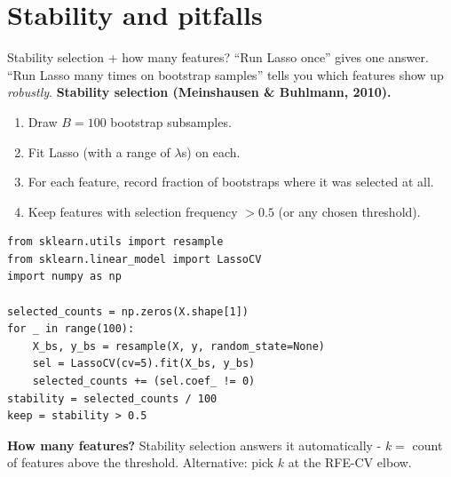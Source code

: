 \documentclass[aspectratio=169]{beamer}
\begin{document}
\section{Stability and pitfalls}

\begin{frame}[fragile]{Stability selection + how many features?}
  ``Run Lasso once'' gives one answer. ``Run Lasso many times on bootstrap samples'' tells you which features show up \emph{robustly}.
  \vfill
  \textbf{Stability selection (Meinshausen \& Buhlmann, 2010).}
  \begin{enumerate}\small
    \item Draw $B = 100$ bootstrap subsamples.
    \item Fit Lasso (with a range of $\lambda$s) on each.
    \item For each feature, record fraction of bootstraps where it was selected at all.
    \item Keep features with selection frequency $> 0.5$ (or any chosen threshold).
  \end{enumerate}
  \vfill
{\lstset{basicstyle=\ttfamily\scriptsize}
\begin{lstlisting}
from sklearn.utils import resample
from sklearn.linear_model import LassoCV
import numpy as np

selected_counts = np.zeros(X.shape[1])
for _ in range(100):
    X_bs, y_bs = resample(X, y, random_state=None)
    sel = LassoCV(cv=5).fit(X_bs, y_bs)
    selected_counts += (sel.coef_ != 0)
stability = selected_counts / 100
keep = stability > 0.5
\end{lstlisting}}
  \vfill
  \footnotesize \textbf{How many features?} Stability selection answers it automatically - $k =$ count of features above the threshold. Alternative: pick $k$ at the RFE-CV elbow.
\end{frame}
\end{document}
